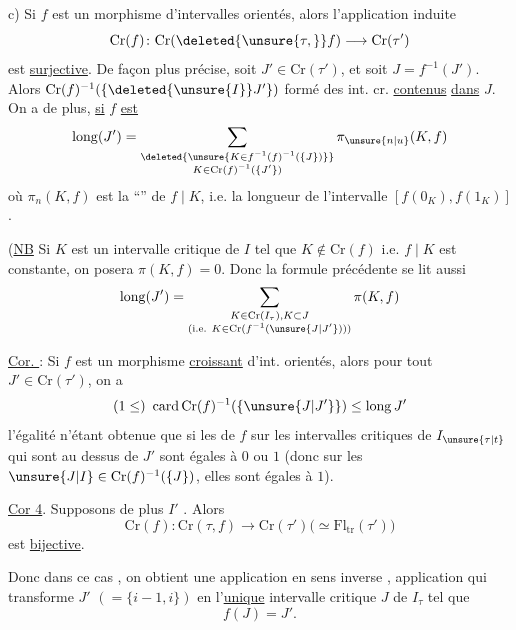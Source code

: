 c) Si $f$ est un morphisme  d'intervalles orientés, alors l'application induite
\[
\mathrm{Cr}(f)\colon\mathrm{Cr}(\deleted{\unsure{\tau,}}f)\longrightarrow\mathrm{Cr}(\tau')
\]
est   \uline{surjective}.  De façon
plus  précise, soit $J'\in\mathrm{Cr}(\tau')$, et soit
$J=f^{-1}(J')$. Alors $\mathrm{Cr}(f)^{-1}(\{\deleted{\unsure{I}}J'\})$  formé des
int. cr.  \uline{contenus} \uline{dans} $J$. 
On a de plus, \uline{si} $f$ \uline{est }
\[
\operatorname{long}(J')=
\sum_{\substack{\deleted{\unsure{K\in f^{-1}(f)^{-1}(\{J\})}}\\
 K\in\mathrm{Cr}(f)^{-1}(\{J'\})}}\pi_{\unsure{n|u}}(K,f)
\]
où $\pi_n(K,f)$ est la ``''  de $f\mid K$,  i.e.
la longueur de l'intervalle $[f(0_K),f(1_K)]$.

(\uline{NB} Si $K$ est un intervalle critique de $I$ tel que
$K\notin\mathrm{Cr}(f)$ i.e. $f\mid K$ est constante, on posera
$\pi(K,f)=0$. Donc la formule précédente se lit aussi
\[
\operatorname{long}(J')=\sum_{\substack{K\in\mathrm{Cr}(I_\tau),K\subset J\\
(\text{i.e. }K\in\mathrm{Cr}(f^{-1}(\unsure{J|J'})))}}\pi(K,f)
\]

\uline{Cor. } : Si $f$ est un morphisme \uline{croissant} d'int.
orientés, alors pour tout $J'\in\mathrm{Cr}(\tau')$,  on a
\[
(1\leq)\ \operatorname{card}\mathrm{Cr}(f)^{-1}(\{\unsure{J|J'}\})\leq\operatorname{long}J'
\]
l'égalité n'étant obtenue que si les  de $f$
sur les intervalles critiques de $I_{\unsure{\tau|t}}$ 
qui sont au dessus de $J'$ sont  égales à $0$ ou $1$
(donc  sur les $\unsure{J|I}\in\mathrm{Cr}(f)^{-1}(\{J\})$, elles sont égales à $1$).

\uline{Cor 4}. Supposons de plus $I'$ . Alors
\[
\mathrm{Cr}(f)\colon\mathrm{Cr}(\tau,f)\longrightarrow\mathrm{Cr}(\tau')
 \bigl(\simeq\mathrm{Fl}_{\mathrm{tr}}(\tau')\bigr)
\]
est \uline{bijective}.

Donc dans ce cas , on obtient une application
en sens inverse
,
application qui transforme 
 $J'$ $(=\{i-1,i\})$ en l'\uline{unique}
intervalle critique $J$ de $I_\tau$ tel que
\[
 f(J)=J'.
\]


